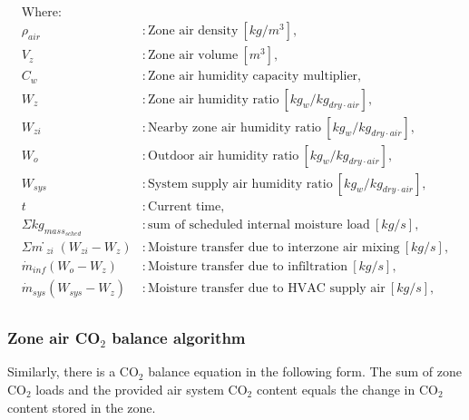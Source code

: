 \documentclass[11pt]{article}
\begin{document}
\begin{align*}
\text{Where: }\\
  \rho_{air} &: \text{Zone air density} ~ [kg/m^{3}], \\
  V_{z} &: \text{Zone air volume} ~ [m^{3}],\\
  C_{w} &: \text{Zone air humidity capacity multiplier},\\
  W_{z} &: \text{Zone air humidity ratio} ~ [kg_w/kg_{dry\cdot air}],\\
  W_{zi} &: \text{Nearby zone air humidity ratio} ~ [kg_w/kg_{dry\cdot air}],\\
  W_{o} &: \text{Outdoor air humidity ratio} ~ [kg_w/kg_{dry\cdot air}],\\
  W_{sys} &: \text{System supply air humidity ratio} ~ [kg_w/kg_{dry\cdot air}],\\
  t &: \text{Current time},\\
  \Sigma{kg_{mass_{sched}}} &: \text{sum of scheduled internal moisture load} ~ [kg/s],\\
  \Sigma{ṁ_{zi}(W_{zi}-W_z)} &: \text{Moisture transfer due to interzone air mixing} ~ [kg/s],\\
  \dot{m}_{inf} (W_o - W_z) &: \text{Moisture transfer due to infiltration} ~ [kg/s],\\
  \dot{m}_{sys} (W_{sys} - W_z) &: \text{Moisture transfer due to HVAC supply air} ~ [kg/s],\\
\end{align*}

\subsubsection{Zone air CO$_2$ balance algorithm}\label{Zone-air-CO$_2$-balance-algorithm}
Similarly, there is a CO$_2$ balance equation in the following form. The sum of zone CO$_2$ loads and the provided air system CO$_2$ content equals the change in CO$_2$ content stored in the zone. 
\end{document}
